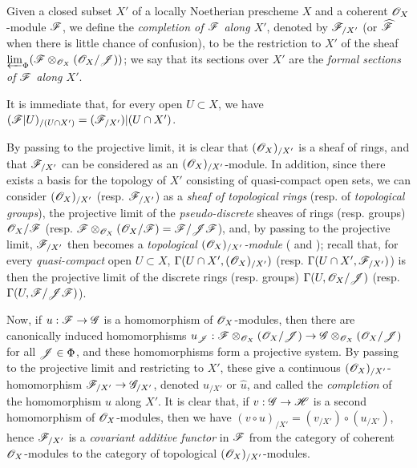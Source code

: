 \begin{definition}[10.8.4]
\label{I.10.8.4}
Given a closed subset $X'$ of a locally Noetherian prescheme $X$ and a coherent $\mathscr{O}_X$-module $\mathscr{F}$, we define the \emph{completion of $\mathscr{F}$ along $X'$}, denoted by $\mathscr{F}_{/X'}$ (or $\widehat{\mathscr{F}}$ when there is little chance of confusion), to be the restriction to $X'$ of the sheaf
$\varprojlim_\Phi(\mathscr{F}\otimes_{\mathscr{O}_X}(\mathscr{O}_X/\mathscr{J}))$; we say that its sections over $X'$ are the \emph{formal sections of $\mathscr{F}$ along $X'$}.
\end{definition}

It is immediate that, for every open $U\subset X$, we have $(\mathscr{F}|U)_{/(U\cap X')}=(\mathscr{F}_{/X'})|(U\cap X')$.

By passing to the projective limit, it is clear that $(\mathscr{O}_X)_{/X'}$ is a sheaf of rings, and that $\mathscr{F}_{/X'}$ can be considered as an $(\mathscr{O}_X)_{/X'}$-module.
In addition, since there exists a basis for the topology of $X'$ consisting of quasi-compact open sets, we can consider $(\mathscr{O}_X)_{/X'}$ (resp. $\mathscr{F}_{/X'}$) as a \emph{sheaf of topological rings} (resp. of \emph{topological groups}), the projective limit of the \emph{pseudo-discrete} sheaves of rings (resp. groups) $\mathscr{O}_X/\mathscr{F}$ (resp. $\mathscr{F}\otimes_{\mathscr{O}_X}(\mathscr{O}_X/\mathscr{F})=\mathscr{F}/\mathscr{J}\mathscr{F}$), and, by passing to the projective limit, $\mathscr{F}_{/X'}$ then becomes a \emph{topological $(\mathscr{O}_X)_{/X'}$-module} ( and ); recall that, for every \emph{quasi-compact} open $U\subset X$, $\Gamma(U\cap X',(\mathscr{O}_X)_{/X'})$ (resp. $\Gamma(U\cap X',\mathscr{F}_{/X'})$) is then the projective limit of the discrete rings (resp. groups) $\Gamma(U,\mathscr{O}_X/\mathscr{J})$ (resp. $\Gamma(U,\mathscr{F}/\mathscr{J}\mathscr{F})$).

Now, if $u:\sh{F}\to\sh{G}$ is a homomorphism of $\mathscr{O}_X$-modules, then there are canonically induced homomorphisms $u_\sh{J}:\sh{F}\otimes_{\sh{O}_X}(\sh{O}_X/\sh{J})\to\sh{G}\otimes_{\sh{O}_X}(\sh{O}_X/\sh{J})$ for all $\mathscr{J}\in\Phi$, and these homomorphisms form a projective system.
By passing to the projective limit and restricting to $X'$, these give a continuous $(\mathscr{O}_X)_{/X'}$-homomorphism $\sh{F}_{/X'}\to\sh{G}_{/X'}$, denoted $u_{/X'}$ or $\widehat{u}$, and called the \emph{completion} of the homomorphism $u$ along $X'$.
It is clear that, if $v:\sh{G}\to\sh{H}$ is a second homomorphism of $\mathscr{O}_X$-modules, then we have $(v\circ u)_{/X'}=(v_{/X'})\circ(u_{/X'})$, hence $\mathscr{F}_{/X'}$ is a \emph{covariant additive functor} in $\mathscr{F}$ from the category of coherent $\mathscr{O}_X$-modules to the category of topological $(\mathscr{O}_X)_{/X'}$-modules.

